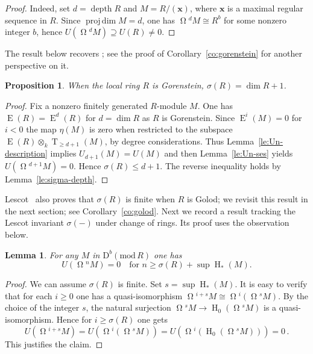 \documentclass{amsart}
\numberwithin{equation}{section}
\theoremstyle{plain}
\newtheorem{proposition}[equation]{Proposition}
\newtheorem{lemma}[equation]{Lemma}
\theoremstyle{definition}
\theoremstyle{remark}
\newcommand{\dbcat}[1]{\mathrm{D}^b(\mathrm{mod}\,{#1})}
\newcommand{\depth}{\operatorname{depth}}
\newcommand{\eee}{\operatorname{E}}
\newcommand{\hh}{\operatorname{H}}
\newcommand{\projdim}{\operatorname{proj\,dim}}
\newcommand{\syz}{\operatorname{\Omega}\!}
\newcommand{\tee}{\operatorname{T}}
\begin{document}
 \begin{proof}
     Indeed, set $d= \depth R$ and $M=R/(\boldsymbol{x})$, where $\boldsymbol{x}$ is a maximal regular sequence in $R$. 
Since $\projdim M=d$, one has $\syz^dM\cong R^b$ for some nonzero integer $b$, hence $U(\syz^dM)\supseteq U(R)\neq 0$.
\end{proof}

The result below recovers \cite[Proposition 3.3]{Lescot:1986}; see the proof of Corollary~\ref{co:gorenstein} for another perspective on it.

\begin{proposition}
    \label{pr:sigma-gor}
When the local ring $R$ is Gorenstein, $\sigma(R)=\dim R+1$.    
\end{proposition}

\begin{proof}
Fix a nonzero finitely generated $R$-module $M$. One has $\eee(R)=\eee^d(R)$ for $d=\dim R$ as $R$ is Gorenstein.  Since $\eee^i(M)=0$ for $i<0$ the map $\eta(M)$ is zero when restricted to the subspace $\eee(R)\otimes_k \tee_{\geqslant d+1}(M)$,  by degree considerations. Thus Lemma~\ref{le:Un-description} implies $U_{d+1}(M)=U(M)$ and then Lemma~\ref{le:Un-ses} yields $U(\syz^{d+1}M)=0$. Hence $\sigma(R)\le d+1$. The reverse inequality holds by Lemma~\ref{le:sigma-depth}.
\end{proof}

Lescot~\cite[Proposition 3.4]{Lescot:1986} also proves that $\sigma(R)$ is finite when $R$ is Golod; we revisit this result in the next section; see Corollary~\ref{co:golod}. Next we record a result tracking the Lescot invariant $\sigma(-)$ under change of rings. Its proof uses the observation below.

\begin{lemma}
  \label{le:lescot-complex} 
For any $M$ in $\dbcat R$ one has
\[
    U(\syz^nM)=0 \quad\text{for $n\ge \sigma(R)+\sup\hh_*(M)$.}
\]
\end{lemma}

\begin{proof}
We can assume $\sigma(R)$ is finite. Set $s=\sup\hh_*(M)$. It is easy to verify that for each $i\ge 0$ one has a quasi-isomorphism $\syz^{i+s}M\cong \syz^i(\syz^sM)$. By the choice of the integer $s$, the natural surjection $\syz^sM\to \hh_0(\syz^sM)$ is a quasi-isomorphism. Hence for $i\ge \sigma(R)$ one gets
\[
U(\syz^{i+s}M)= U(\syz^i(\syz^sM)) = U(\syz^i(\hh_0(\syz^sM))) = 0\,.
\]
This justifies the claim.
\end{proof}
\end{document}
